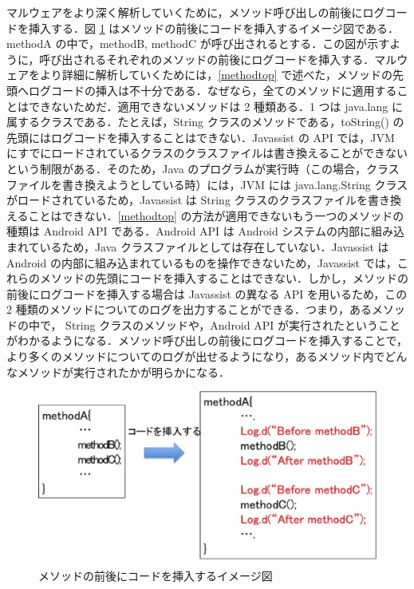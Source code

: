 マルウェアをより深く解析していくために，メソッド呼び出しの前後にログコードを挿入する．図 \ref{insertbetw} はメソッドの前後にコードを挿入するイメージ図である．methodA の中で，methodB, methodC が呼び出されるとする．この図が示すように，呼び出されるそれぞれのメソッドの前後にログコードを挿入する．マルウェアをより詳細に解析していくためには，\ref{methodtop} で述べた，メソッドの先頭へログコードの挿入は不十分である．なぜなら，全てのメソッドに適用することはできないためだ．適用できないメソッドは 2 種類ある．1 つは java.lang に属するクラスである．たとえば，String クラスのメソッドである，toString() の先頭にはログコードを挿入することはできない．Javassist の API では，JVM にすでにロードされているクラスのクラスファイルは書き換えることができないという制限がある．そのため，Java のプログラムが実行時（この場合，クラスファイルを書き換えようとしている時）には，JVM には java.lang.String クラスがロードされているため，Javassist は String  クラスのクラスファイルを書き換えることはできない．\ref{methodtop} の方法が適用できないもう一つのメソッドの種類は Android API である．Android API は Android システムの内部に組み込まれているため，Java クラスファイルとしては存在していない．Javassist は Android の内部に組み込まれているものを操作できないため，Javassist では，これらのメソッドの先頭にコードを挿入することはできない．しかし，メソッドの前後にログコードを挿入する場合は Javassist の異なる API を用いるため，この 2 種類のメソッドについてのログを出力することができる．つまり，あるメソッドの中で，  String クラスのメソッドや，Android API が実行されたということがわかるようになる．メソッド呼び出しの前後にログコードを挿入することで，より多くのメソッドについてのログが出せるようになり，あるメソッド内でどんなメソッドが実行されたかが明らかになる．

\begin{figure}[t]
\begin{center}
\includegraphics[scale=0.5]{image4.eps}
\end{center}
\caption{メソッドの前後にコードを挿入するイメージ図}
\label{insertbetw}
\end{figure}

